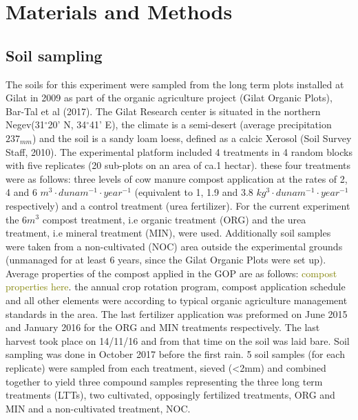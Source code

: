 \documentclass[12pt]{report}
\newcommand{\myGreen}[1]{\textcolor{olive}{#1}} %
\begin{document}
	
	
	\chapter{Materials and Methods}

\section{Soil sampling}
The soils for this experiment were sampled from the long term plots installed at Gilat in 2009 as part of the organic agriculture project (Gilat Organic Plots), Bar-Tal et al (2017). The Gilat Research center is situated in the northern Negev(31$^\circ$20' N, 34$^\circ$41' E), the climate is a semi-desert (average precipitation $ 237_{mm} $) and the soil is a sandy loam loess, defined as a calcic Xerosol (Soil Survey Staff, 2010). The experimental platform included 4 treatments in 4 random blocks with five replicates (20 sub-plots on an area of ca.1 hectar). these four treatments were as follows: three levels of cow manure compost application at the rates of 2, 4 and 6 $m^3\cdot dunam^{-1}\cdot year^{-1}$ (equivalent to 1, 1.9 and 3.8 $kg^3\cdot dunam^{-1}\cdot year^{-1}$ respectively) and a control treatment (urea fertilizer). For the current experiment the 6$m^3$ compost treatment, i.e organic treatment (ORG) and the urea treatment, i.e mineral treatment (MIN), were used. Additionally soil samples were taken from a non-cultivated (NOC) area outside the experimental grounds (unmanaged for at least 6 years, since the Gilat Organic Plots were set up). Average properties of the compost applied in the GOP are as follows: \myGreen{compost properties here}. the annual crop rotation program, compost application schedule and all other elements were according to typical organic agriculture management standards in the area. The last fertilizer application was preformed on June 2015 and January 2016 for the ORG and MIN treatments respectively. The last harvest took place on 14/11/16 and from that time on the soil was laid bare. Soil sampling was done in October 2017 before the first rain. 5 soil samples (for each replicate) were sampled from each treatment, sieved (\textless 2mm) and combined together to yield three compound samples representing the three long term treatments (LTTs), two cultivated, opposingly fertilized treatments, ORG and MIN and a non-cultivated treatment, NOC. 
    
\end{document}
